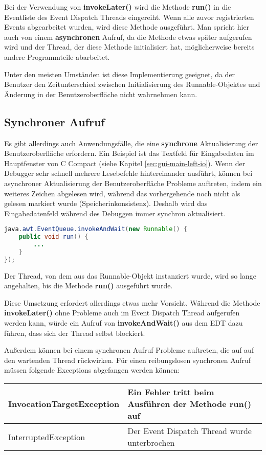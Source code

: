 	Bei der Verwendung von \textbf{invokeLater()} wird die Methode \textbf{run()} in die Eventliste des Event Dispatch Threads eingereiht. Wenn alle zuvor registrierten Events abgearbeitet wurden, wird diese Methode ausgeführt. Man spricht hier auch von einem \textbf{asynchronen} Aufruf, da die Methode etwas später aufgerufen wird und der Thread, der diese Methode initialisiert hat, möglicherweise bereits andere Programmteile abarbeitet.
	
	Unter den meisten Umständen ist diese Implementierung geeignet, da der Benutzer den Zeitunterschied zwischen Initialisierung des Runnable-Objektes und Änderung in der Benutzeroberfläche nicht wahrnehmen kann. 
	
\subsection*{Synchroner Aufruf}
Es gibt allerdings auch Anwendungsfälle, die eine \textbf{synchrone} Aktualisierung der Benutzeroberfläche erfordern. Ein Beispiel ist das Textfeld für Eingabedaten im Hauptfenster von C Compact (siehe Kapitel \ref{sec:gui-main-left-io}). Wenn der Debugger sehr schnell mehrere Lesebefehle hintereinander ausführt, können bei asynchroner Aktualisierung der Benutzeroberfläche Probleme auftreten, indem ein weiteres Zeichen abgelesen wird, während das vorhergehende noch nicht als gelesen markiert wurde (Speicherinkonsistenz). Deshalb wird das Eingabedatenfeld während des Debuggen immer synchron aktualisiert.
\begin{lstlisting}[language=JAVA]
java.awt.EventQueue.invokeAndWait(new Runnable() {
	public void run() {
		...
	}
});
\end{lstlisting}
	Der Thread, von dem aus das Runnable-Objekt instanziert wurde, wird so lange angehalten, bis die Methode \textbf{run()} ausgeführt wurde.

	Diese Umsetzung erfordert allerdings etwas mehr Vorsicht. Während die Methode \textbf{invokeLater()} ohne Probleme auch im Event Dispatch Thread aufgerufen werden kann, würde ein Aufruf von \textbf{invokeAndWait()} aus dem EDT dazu führen, dass sich der Thread selbst blockiert.
	
	Außerdem können bei einem synchronen Aufruf Probleme auftreten, die auf auf den wartenden Thread rückwirken. Für einen reibungslosen synchronen Aufruf müssen folgende Exceptions abgefangen werden können:

\def\arraystretch{2.1}
\begin{tabular}{|l|l|}
	\hline
	InvocationTargetException & \parbox{7cm}{Ein Fehler tritt beim Ausführen der Methode \textbf{run()} auf}\\
	\hline
	InterruptedException & \parbox{7cm}{Der Event Dispatch Thread wurde unterbrochen}\\
	\hline
\end{tabular}



